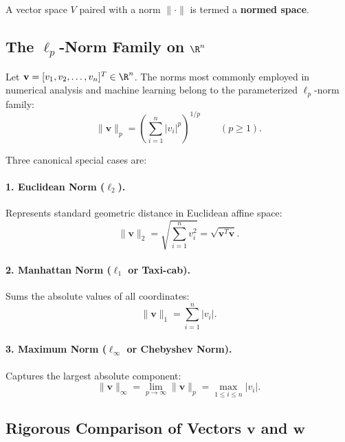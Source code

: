 A vector space $V$ paired with a norm $\|\cdot\|$ is termed a \textbf{normed space}.

\subsection{The \texorpdfstring{$\ell_p$}{lp}-Norm Family on \texorpdfstring{$\R^n$}{Rn}}

Let $\mathbf{v} = [v_1, v_2, \dots, v_n]^T \in \R^n$. The norms most commonly employed in numerical analysis and machine learning belong to the parameterized $\ell_p$-norm family:
\begin{equation}
    \|\mathbf{v}\|_p = \left( \sum_{i=1}^n |v_i|^p \right)^{1/p} \qquad (p \ge 1).
\end{equation}

Three canonical special cases are:

\paragraph{1. Euclidean Norm ($\ell_2$).}
Represents standard geometric distance in Euclidean affine space:
\begin{equation}
    \|\mathbf{v}\|_2 = \sqrt{\sum_{i=1}^n v_i^2} = \sqrt{\mathbf{v}^T \mathbf{v}}.
\end{equation}

\paragraph{2. Manhattan Norm ($\ell_1$ or Taxi-cab).}
Sums the absolute values of all coordinates:
\begin{equation}
    \|\mathbf{v}\|_1 = \sum_{i=1}^n |v_i|.
\end{equation}

\paragraph{3. Maximum Norm ($\ell_\infty$ or Chebyshev Norm).}
Captures the largest absolute component:
\begin{equation}
    \|\mathbf{v}\|_\infty = \lim_{p \to \infty} \|\mathbf{v}\|_p = \max_{1 \le i \le n} |v_i|.
\end{equation}

\subsection{Rigorous Comparison of Vectors \texorpdfstring{$\mathbf{v}$}{v} and \texorpdfstring{$\mathbf{w}$}{w}}

